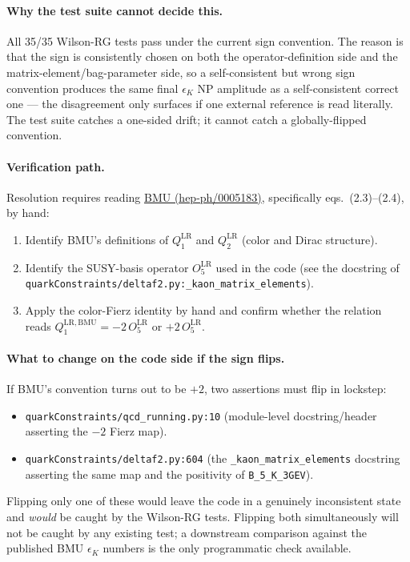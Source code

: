 \documentclass[11pt]{article}
\newcommand{\eK}{\epsilon_K}
\begin{document}
\paragraph{Why the test suite cannot decide this.}
All 35/35 Wilson-RG tests pass under the current sign convention.
The reason is that the sign is consistently chosen on both the
operator-definition side and the matrix-element/bag-parameter side, so
a self-consistent but wrong sign convention produces the same final
$\eK$ NP amplitude as a self-consistent correct one --- the
disagreement only surfaces if one external reference is read
literally.  The test suite catches a one-sided drift; it cannot catch
a globally-flipped convention.

\paragraph{Verification path.}
Resolution requires reading
\href{https://arxiv.org/abs/hep-ph/0005183}{BMU (hep-ph/0005183)},
specifically eqs.~(2.3)--(2.4), by hand:
\begin{enumerate}[nosep]
  \item Identify BMU's definitions of $Q_1^{\mathrm{LR}}$ and
    $Q_2^{\mathrm{LR}}$ (color and Dirac structure).
  \item Identify the SUSY-basis operator $O_5^{\mathrm{LR}}$ used in
    the code (see the docstring of
    \texttt{quarkConstraints/deltaf2.py:\_kaon\_matrix\_elements}).
  \item Apply the color-Fierz identity by hand and confirm whether the
    relation reads $Q_1^{\mathrm{LR,BMU}} = -2\,O_5^{\mathrm{LR}}$ or
    $+2\,O_5^{\mathrm{LR}}$.
\end{enumerate}

\paragraph{What to change on the code side if the sign flips.}
If BMU's convention turns out to be $+2$, two assertions must flip in
lockstep:
\begin{itemize}[nosep]
  \item \texttt{quarkConstraints/qcd\_running.py:10} (module-level
    docstring/header asserting the $-2$ Fierz map).
  \item \texttt{quarkConstraints/deltaf2.py:604} (the
    \texttt{\_kaon\_matrix\_elements} docstring asserting the same map
    and the positivity of \texttt{B\_5\_K\_3GEV}).
\end{itemize}
Flipping only one of these would leave the code in a genuinely
inconsistent state and \emph{would} be caught by the Wilson-RG tests.
Flipping both simultaneously will not be caught by any existing test;
a downstream comparison against the published BMU $\eK$ numbers is the
only programmatic check available.
\end{document}
